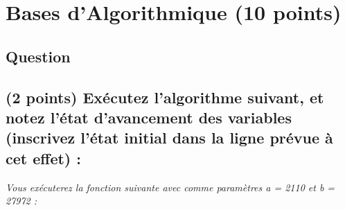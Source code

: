\documentclass[11pt,a4paper]{article}
\begin{document}



\section{Bases d'Algorithmique (10 points)}

\subsection*{Question}

\subsection{(2 points) Exécutez l'algorithme suivant, et notez l'état d'avancement des variables (inscrivez l'état initial dans la ligne prévue à cet effet) : }

\bigskip

\begin{center}
\textit{Vous exécuterez la fonction suivante avec comme paramètres a = 2110 et b = 27972 : }
\end{center}
\end{document}

